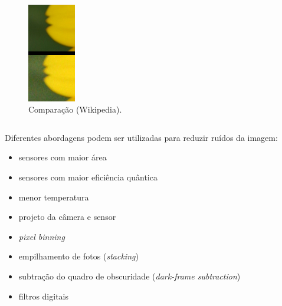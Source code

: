 \begin{frame}[allowframebreaks]
\begin{columns}[c]
    \begin{figure}[h!]
    \centering
    \includegraphics[width=0.5\textwidth]{images/comparison03.jpg}
    \caption{Comparação (Wikipedia).}
    \label{fig:comparison03}
    \end{figure}
 
  \end{columns}

  \framebreak

  Diferentes abordagens podem ser utilizadas para reduzir ruídos da imagem:
  \begin{itemize}
  \item sensores com maior área
  \item sensores com maior eficiência quântica
  \item menor temperatura
  \item projeto da câmera e sensor
  \item \textit{pixel binning}
  \item empilhamento de fotos (\textit{stacking})
  \item subtração do quadro de obscuridade (\textit{dark-frame subtraction})
  \item filtros digitais
  \end{itemize}
\end{frame}
